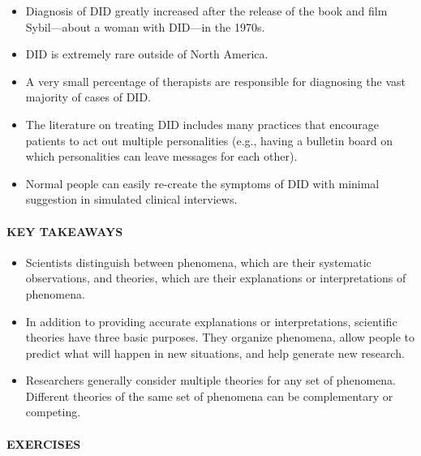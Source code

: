 \documentclass[
]{krantz}
\providecommand{\tightlist}{%
  \setlength{\itemsep}{0pt}\setlength{\parskip}{0pt}}
\begin{document}
\begin{itemize}
\tightlist
\item
  Diagnosis of DID greatly increased after the release of the book and film Sybil---about a woman with DID---in the 1970s.
\item
  DID is extremely rare outside of North America.
\item
  A very small percentage of therapists are responsible for diagnosing the vast majority of cases of DID.
\item
  The literature on treating DID includes many practices that encourage patients to act out multiple personalities (e.g., having a bulletin board on which personalities can leave messages for each other).
\item
  Normal people can easily re-create the symptoms of DID with minimal suggestion in simulated clinical interviews.
\end{itemize}

\paragraph*{KEY TAKEAWAYS}\label{key-takeaways-27}

\begin{itemize}
\tightlist
\item
  Scientists distinguish between phenomena, which are their systematic observations, and theories, which are their explanations or interpretations of phenomena.
\item
  In addition to providing accurate explanations or interpretations, scientific theories have three basic purposes. They organize phenomena, allow people to predict what will happen in new situations, and help generate new research.
\item
  Researchers generally consider multiple theories for any set of phenomena. Different theories of the same set of phenomena can be complementary or competing.
\end{itemize}

\paragraph*{EXERCISES}\label{exercises-22}
\end{document}
